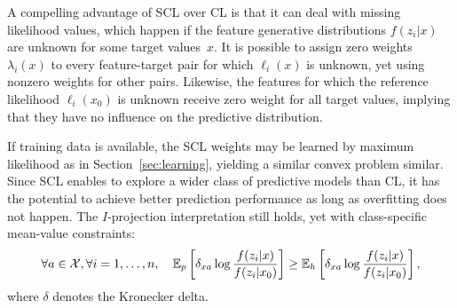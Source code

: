 \documentclass[english]{scrartcl}
\newcommand{\E}{\mathbb{E}}
\begin{document}

A compelling advantage of SCL over CL is that it can deal with missing likelihood values, which happen if the feature generative distributions $f(z_i|x)$ are unknown for some target values~$x$. It is possible to assign zero weights $\lambda_i(x)$ to every feature-target pair for which $\ell_i(x)$ is unknown, yet using nonzero weights for other pairs. Likewise, the features for which the reference likelihood $\ell_i(x_0)$ is unknown receive zero weight for all target values, implying that they have no influence on the predictive distribution. 


If training data is available, the SCL weights may be learned by maximum likelihood as in Section~\ref{sec:learning}, yielding a similar convex problem similar. Since SCL enables to explore a wider class of predictive models than CL, it has the potential to achieve better prediction performance as long as overfitting does not happen. The $I$-projection interpretation still holds, yet with class-specific mean-value constraints:
$$
\forall a\in{\cal X}, \forall i=1,\ldots,n,
\quad
\E_p\left[\delta_{xa}\log \frac{f(z_i|x)}{f(z_i|x_0)}\right]
\geq \E_h\left[\delta_{xa}\log \frac{f(z_i|x)}{f(z_i|x_0)}\right],
$$
where $\delta$ denotes the Kronecker delta.


\end{document}
